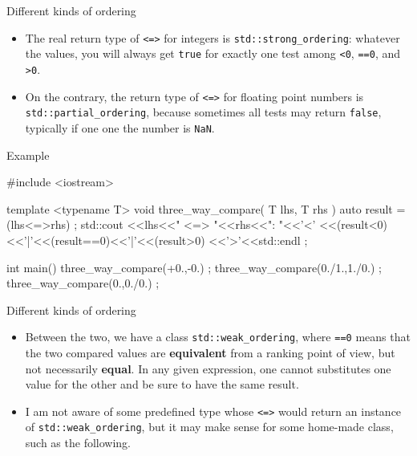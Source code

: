 \begin{frame}[fragile]
  \begin{block}{Different kinds of ordering}
    \begin{itemize}
    \item The real return type of \texttt{<=>} for integers is \texttt{std::strong_ordering}: whatever the values, you will always get \texttt{true} for exactly one test among \texttt{<0}, \texttt{==0}, and \texttt{>0}.
    \item On the contrary, the return type of \texttt{<=>} for floating point numbers is \texttt{std::partial_ordering}, because sometimes all tests may return \texttt{false}, typically if one one the number is \texttt{NaN}.
    \end{itemize}
  \end{block}
  \begin{exampleblock}{Example}
    \begin{cppcode*}{}
    #include <iostream>

    template <typename T>
    void three_way_compare( T lhs, T rhs )
     {
      auto result = (lhs<=>rhs) ;
      std::cout
        <<lhs<<" <=> "<<rhs<<": "<<'<'
        <<(result<0)<<'|'<<(result==0)<<'|'<<(result>0)
        <<'>'<<std::endl ;
     }

    int main()
     {
      three_way_compare(+0.,-0.) ;
      three_way_compare(0./1.,1./0.) ;
      three_way_compare(0.,0./0.) ;
     }
    \end{cppcode*}
  \end{exampleblock}
\end{frame}

\begin{frame}[fragile]
  \begin{block}{Different kinds of ordering}
    \begin{itemize}
      \item Between the two, we have a class \texttt{std::weak_ordering}, where \texttt{==0} means that the two compared values are \textbf{equivalent} from a ranking point of view, but not necessarily \textbf{equal}. In any given expression, one cannot substitutes one value for the other and be sure to have the same result.
      \item I am not aware of some predefined type whose \texttt{<=>} would return an instance of \texttt{std::weak_ordering}, but it may make sense for some home-made class, such as the following.
    \end{itemize}
  \end{block}
\end{frame}

